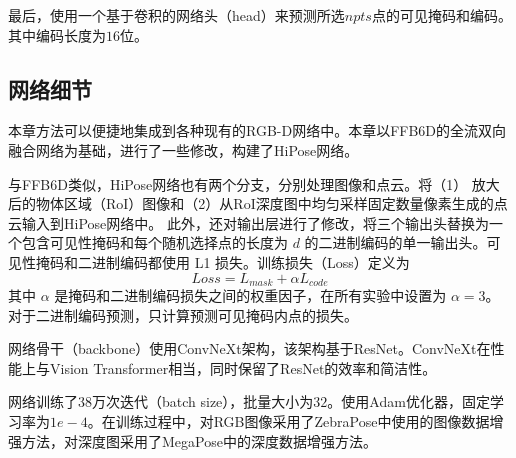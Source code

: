 最后，使用一个基于卷积的网络头（head）来预测所选$npts$点的可见掩码和编码。其中编码长度为$16$位。

\subsection{网络细节}\label{subsection:implementation_details}
本章方法可以便捷地集成到各种现有的RGB-D网络中。本章以FFB6D\cite{he2021ffb6d}的全流双向融合网络为基础，进行了一些修改，构建了HiPose网络。

与FFB6D类似，HiPose网络也有两个分支，分别处理图像和点云。将（1） 放大后的物体区域（RoI）图像和（2）从RoI深度图中均匀采样固定数量像素生成的点云输入到HiPose网络中。
此外，还对输出层进行了修改，将三个输出头替换为一个包含可见性掩码和每个随机选择点的长度为 $d$ 的二进制编码的单一输出头。可见性掩码和二进制编码都使用 L1 损失。训练损失（Loss）定义为
\begin{equation}
Loss = L_{mask} + \alpha L_{code}   
\end{equation}
其中 $\alpha$ 是掩码和二进制编码损失之间的权重因子，在所有实验中设置为 $\alpha = 3$。对于二进制编码预测，只计算预测可见掩码内点的损失。

网络骨干（backbone）使用ConvNeXt\cite{Liu2022ACF}架构，该架构基于ResNet\cite{He2015DeepRL}。ConvNeXt在性能上与Vision Transformer\cite{Dosovitskiy2020AnII}相当，同时保留了ResNet的效率和简洁性。

网络训练了$38$万次迭代（batch size），批量大小为$32$。使用Adam\cite{Kingma2014AdamAM}优化器，固定学习率为$1e-4$。在训练过程中，对RGB图像采用了ZebraPose\cite{su2022zebrapose}中使用的图像数据增强方法，对深度图采用了MegaPose\cite{Labbe2022MegaPose6P}中的深度数据增强方法。

